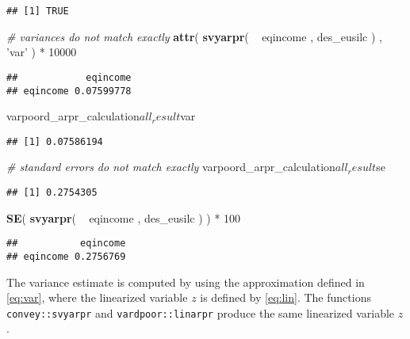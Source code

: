 \documentclass[]{book}
\newenvironment{Shaded}{\begin{snugshade}}{\end{snugshade}}
\newcommand{\KeywordTok}[1]{\textcolor[rgb]{0.13,0.29,0.53}{\textbf{{#1}}}}
\newcommand{\DecValTok}[1]{\textcolor[rgb]{0.00,0.00,0.81}{{#1}}}
\newcommand{\StringTok}[1]{\textcolor[rgb]{0.31,0.60,0.02}{{#1}}}
\newcommand{\CommentTok}[1]{\textcolor[rgb]{0.56,0.35,0.01}{\textit{{#1}}}}
\newcommand{\NormalTok}[1]{{#1}}
\begin{document}
\begin{verbatim}
## [1] TRUE
\end{verbatim}

\begin{Shaded}
\begin{Highlighting}[]
\CommentTok{# variances do not match exactly}
\KeywordTok{attr}\NormalTok{( }\KeywordTok{svyarpr}\NormalTok{( ~}\StringTok{ }\NormalTok{eqincome , des_eusilc ) , }\StringTok{'var'} \NormalTok{) *}\StringTok{ }\DecValTok{10000}
\end{Highlighting}
\end{Shaded}

\begin{verbatim}
##            eqincome
## eqincome 0.07599778
\end{verbatim}

\begin{Shaded}
\begin{Highlighting}[]
\NormalTok{varpoord_arpr_calculation$all_result$var}
\end{Highlighting}
\end{Shaded}

\begin{verbatim}
## [1] 0.07586194
\end{verbatim}

\begin{Shaded}
\begin{Highlighting}[]
\CommentTok{# standard errors do not match exactly}
\NormalTok{varpoord_arpr_calculation$all_result$se}
\end{Highlighting}
\end{Shaded}

\begin{verbatim}
## [1] 0.2754305
\end{verbatim}

\begin{Shaded}
\begin{Highlighting}[]
\KeywordTok{SE}\NormalTok{( }\KeywordTok{svyarpr}\NormalTok{( ~}\StringTok{ }\NormalTok{eqincome , des_eusilc ) ) *}\StringTok{ }\DecValTok{100}
\end{Highlighting}
\end{Shaded}

\begin{verbatim}
##           eqincome
## eqincome 0.2756769
\end{verbatim}

The variance estimate is computed by using the approximation defined in
\eqref{eq:var}, where the linearized variable \(z\) is defined by
\eqref{eq:lin}. The functions \texttt{convey::svyarpr} and
\texttt{vardpoor::linarpr} produce the same linearized variable \(z\).
\end{document}
